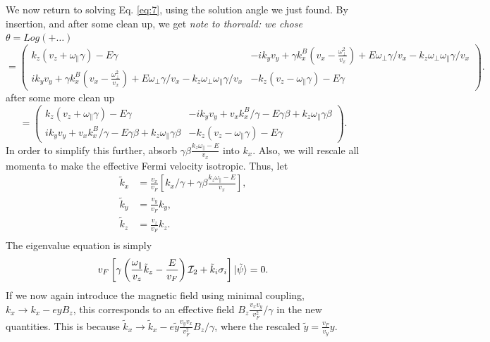 We now return to solving Eq. \eqref{eq:7}, using the solution angle we just found.
By insertion, and after some clean up, we get
\emph{note to thorvald: we chose \(\theta = Log \left(+ \dots\right) \)}
\begin{equation}
  \label{eq:16}
  =
  \begin{pmatrix}
    k_z (v_{z} + \omega_{\parallel} \gamma) - E \gamma   & -i k_{y} v_{y} + \gamma k^{B}_{x} (v_{x} - \frac{\omega_{\perp}^{2}}{v_{x}}) + E \omega_{\perp} \gamma /v_{x} - k_{z} \omega _{\perp} \omega _{\parallel} \gamma /v_{x}\\
    i k_{y} v_{y} + \gamma k^B_{x} (v_{x} - \frac{\omega_{\perp}^{2}}{v_{x}}) + E \omega_{\perp} \gamma /v_{x} - k_{z} \omega _{\perp} \omega _{\parallel} \gamma  / v_{x}
    & -k_{z} (v_{z} - \omega_{\parallel} \gamma) - E \gamma
  \end{pmatrix}.
\end{equation}
after some more clean up
\begin{equation}
  \label{eq:17}
  =
  \begin{pmatrix}
    k_z (v_{z} + \omega_{\parallel} \gamma) - E \gamma   & -i k_{y} v_{y} + v_{x} k^B_{x} / \gamma  - E  \gamma \beta  + k_{z} \omega _{\parallel} \gamma \beta \\
    i k_{y} v_{y} + v_{x} k^B_{x} / \gamma  - E  \gamma \beta  + k_{z} \omega _{\parallel} \gamma \beta
    & -k_{z} (v_{z} - \omega_{\parallel} \gamma) - E \gamma
  \end{pmatrix}.
\end{equation}
In order to simplify this further, absorb \(\gamma \beta \frac{k_{z} \omega_{\parallel} - E}{v_{x}}\) into \(k_{x}\).
Also, we will rescale all momenta to make the effective Fermi velocity isotropic.
Thus, let
\begin{equation}
  \begin{split}
    \tilde{k}_{x} &= \frac{v_{x}}{v_{F}} \left[  k_{x} / \gamma + \gamma \beta \frac{k_{z} \omega_{\parallel} - E}{v_{x}} \right],\\
    \tilde{k}_{y} &= \frac{v_{y}}{v_{F}} k_{y},\\
    \tilde{k}_{z} &= \frac{v_{z}}{v_{F}} k_{z}.\\
  \end{split}
\end{equation}
The eigenvalue equation is simply
\begin{equation}
  \label{eq:18}
  v_{F} \left[  \gamma \left( \frac{\omega_{\parallel}}{v_{z}} \tilde{k}_{z} - \frac{E}{v_{F}} \right) \mathcal{I}_{2} +
  \tilde{k}_{i} \sigma _{i} \right] \ket{\tilde{\psi}}= 0.
\end{equation}
If we now again introduce the magnetic field using minimal coupling, \(k_{x} \to  k_{x} - ey B_{z} \), this corresponds to an effective field \(B_{z} \frac{v_{x} v_{y}}{v_{F}^2} / \gamma \) in the new quantities.
This is because \(\tilde{k}_{x} \to  \tilde{k}_{x} - e \tilde{y} \frac{v_{y} v_{x}}{v_{F}^2}  B_{z} /\gamma \), where the rescaled \(\tilde{y} = \frac{v_{F}}{v_{y}} y\).

